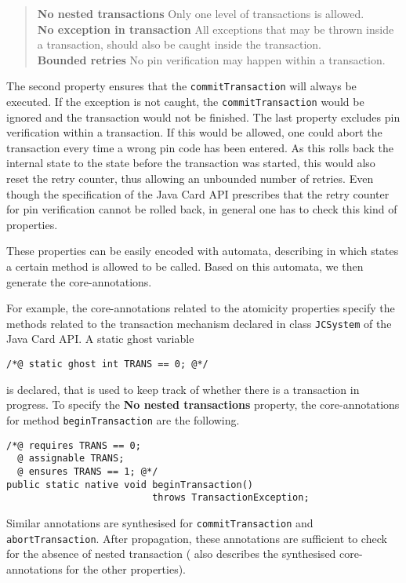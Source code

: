 \begin{quote}
\textbf{No nested transactions} Only one level of transactions
is allowed.\smallskip\\
\textbf{No exception in transaction} All exceptions that may be thrown
inside a transaction, should also be caught inside the
transaction.\smallskip\\
\textbf{Bounded retries}
No pin verification may happen within a transaction.
\end{quote} 
The second property ensures that the \texttt{commitTransaction} will
always be executed. If the exception is not caught, the
\texttt{commitTransaction} would be ignored and the transaction would
not be finished. The last property excludes pin verification within a
transaction. If this would be allowed, one could abort the transaction
every time a wrong pin code has been entered. As this rolls
back the internal state to the state before the transaction was
started, this would also reset the retry counter, thus allowing an
unbounded number of retries. Even though the specification of the Java
Card API prescribes that the retry counter for pin verification cannot
be rolled back, in general one has to check this kind of properties.

These properties can be easily encoded with automata, describing in
which states a certain method is allowed to be called. Based on this
automata, we then generate the core-annotations.

For example, the core-annotations related to the atomicity properties
specify the methods related to the transaction mechanism declared in
class
\texttt{JCSystem} of the Java Card API. A static ghost variable 
\begin{verbatim}
/*@ static ghost int TRANS == 0; @*/
\end{verbatim}
is declared, that is used to keep track of whether there is a
transaction in progress.  To specify the \textbf{No nested
transactions} property, the core-annotations for method
\texttt{beginTransaction} are the following. 

\begin{verbatim}
/*@ requires TRANS == 0;
  @ assignable TRANS;
  @ ensures TRANS == 1; @*/
public static native void beginTransaction() 
                          throws TransactionException;
\end{verbatim}
Similar annotations are synthesised for \texttt{commitTransaction} and
\texttt{abortTransaction}. After propagation, these annotations are 
sufficient to check for the
absence of nested transaction (\cite{PavlovaBBHL04cardis} also
describes the synthesised core-annotations for the other properties).

